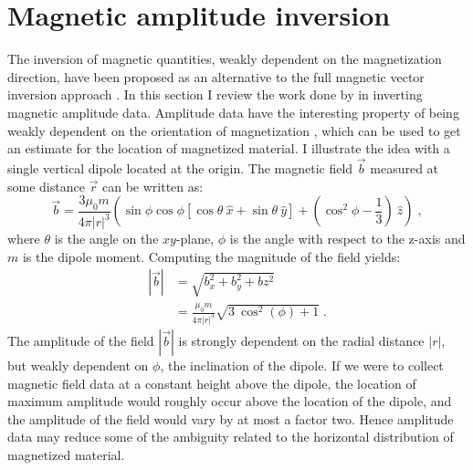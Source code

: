 \newpage
\section{Magnetic amplitude inversion}\label{MAI}

The inversion of magnetic quantities, weakly dependent on the magnetization direction, have been proposed as an alternative to the full magnetic vector inversion approach \cite[]{LiShearer10}.
In this section I review the work done by \cite{Shearer05} in inverting magnetic amplitude data.
Amplitude data have the interesting property of being weakly dependent on the orientation of magnetization \cite[]{Nabighian72}, which can be used to get an estimate for the location of magnetized material. I illustrate the idea with a single vertical dipole located at the origin. The magnetic field $\vec {b}$ measured at some distance $\vec r$ can be written as:
 \begin{equation}
\vec {b} = \frac{3\mu_0 m}{{4\pi |r|}^3}\left (\sin{\phi}\cos{\phi}[ \cos{\theta}\:{\hat x} + \sin{\theta}\:{\hat y}] + (\cos^2{\phi} - \frac{1}{3})\:{\hat z} \right) \; ,
\end{equation}
where $\theta$ is the angle on the $xy$-plane, $\phi$ is the angle with respect to the z-axis and $m$ is the dipole moment.
Computing the magnitude of the field yields:
 \begin{equation}
\begin{split}
{|\vec b|} &= \sqrt{ b_x^2 + b_y^2 + bz^2} \\
&= \frac{\mu_0 m}{4\pi|r|^3} \sqrt{3\:\cos^2{(\phi)} + 1} \;.
\end{split}
\end{equation}
The amplitude of the field ${|\vec b|}$ is strongly dependent on the radial distance ${|r|}$, but weakly dependent on $\phi$, the inclination of the dipole. 
If we were to collect magnetic field data at a constant height above the dipole, the location of maximum amplitude would roughly occur above the location of the dipole, and the amplitude of the field would vary by at most a factor two. 
Hence amplitude data may reduce some of the ambiguity related to the horizontal distribution of magnetized material. 

